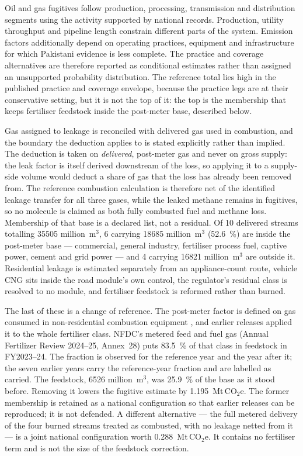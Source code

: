 \documentclass[essd]{copernicus}
\begin{document}
Oil and gas fugitives follow production, processing, transmission and distribution segments using the activity supported by national records. Production, utility throughput and pipeline length constrain different parts of the system. Emission factors additionally depend on operating practices, equipment and infrastructure for which Pakistani evidence is less complete. The practice and coverage alternatives are therefore reported as conditional estimates rather than assigned an unsupported probability distribution. The reference total lies high in the published practice and coverage envelope, because the practice legs are at their conservative setting, but it is not the top of it: the top is the membership that keeps fertiliser feedstock inside the post-meter base, described below.

Gas assigned to leakage is reconciled with delivered gas used in combustion, and the boundary the deduction applies to is stated explicitly rather than implied. The deduction is taken on \emph{delivered}, post-meter gas and never on gross supply: the leak factor is itself derived downstream of the loss, so applying it to a supply-side volume would deduct a share of gas that the loss has already been removed from. The reference combustion calculation is therefore net of the identified leakage transfer for all three gases, while the leaked methane remains in fugitives, so no molecule is claimed as both fully combusted fuel and methane loss. Membership of that base is a declared list, not a residual. Of \num{10} delivered streams totalling \SI{35505}{} million~m$^3$, \num{6} carrying \SI{18685}{} million~m$^3$ (\SI{52.6}{\percent}) are inside the post-meter base --- commercial, general industry, fertiliser process fuel, captive power, cement and grid power --- and \num{4} carrying \SI{16821}{} million~m$^3$ are outside it. Residential leakage is estimated separately from an appliance-count route, vehicle CNG sits inside the road module's own control, the regulator's residual class is resolved to no module, and fertiliser feedstock is reformed rather than burned.

The last of these is a change of reference. The post-meter factor is defined on gas consumed in non-residential combustion equipment \citep{IPCC2019}, and earlier releases applied it to the whole fertiliser class. NFDC's metered feed and fuel gas (Annual Fertilizer Review 2024--25, Annex~28) puts \SI{83.5}{\percent} of that class in feedstock in FY2023--24. The fraction is observed for the reference year and the year after it; the seven earlier years carry the reference-year fraction and are labelled as carried. The feedstock, \SI{6526}{} million~m$^3$, was \SI{25.9}{\percent} of the base as it stood before. Removing it lowers the fugitive estimate by \SI{1.195}{\mega\tonne}\,CO$_2$e. The former membership is retained as a national configuration so that earlier releases can be reproduced; it is not defended. A different alternative --- the full metered delivery of the four burned streams treated as combusted, with no leakage netted from it --- is a joint national configuration worth \SI{0.288}{\mega\tonne}\,CO$_2$e. It contains no fertiliser term and is not the size of the feedstock correction.
\end{document}
